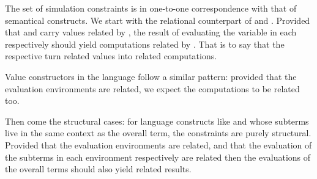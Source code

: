 \begin{AgdaSuppressSpace}
\end{AgdaSuppressSpace}

The set of simulation constraints is in one-to-one correspondence with that of
semantical constructs. We start with the relational counterpart of 
and . Provided that  and  carry values related by
, the result of evaluating the variable  in each respectively
should yield computations related by . That is to say that the
respective  turn related values into related computations.

\begin{AgdaSuppressSpace}
\end{AgdaSuppressSpace}

Value constructors in the language follow a similar pattern: provided that
the evaluation environments are related, we expect the computations to be
related too.

\noindent\begin{minipage}{0.6\textwidth}
\end{minipage}\hfill\begin{minipage}{0.4\textwidth}
\end{minipage}

Then come the structural cases: for language constructs like 
and  whose subterms live in the same context as the overall
term, the constraints are purely structural. Provided that the evaluation
environments are related, and that the evaluation of the subterms in
each environment respectively are related then the evaluations of the
overall terms should also yield related results.

\begin{AgdaSuppressSpace}
\end{AgdaSuppressSpace}


